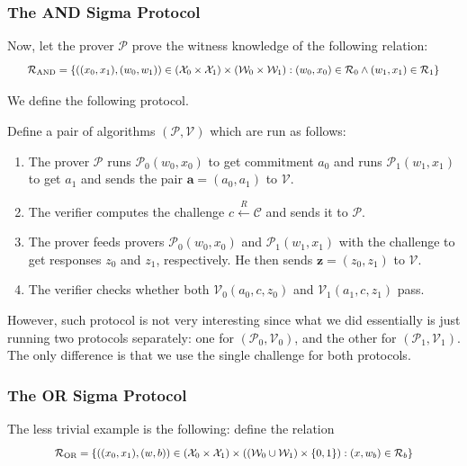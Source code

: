 \documentclass[../lecture-notes-148x210.tex]{subfiles}
\begin{document}
\subsubsection{The AND Sigma Protocol}

Now, let the prover $\mathcal{P}$ prove the witness knowledge of the following relation:
\begin{equation*}
    \scalebox{0.85}{$
        \mathcal{R}_{\text{AND}} = \left\{ ((x_0,x_1), (w_0,w_1)) \in (\mathcal{X}_0 \times \mathcal{X}_1) \times (\mathcal{W}_0 \times \mathcal{W}_1): (w_0,x_0) \in \mathcal{R}_0 \wedge (w_1,x_1) \in \mathcal{R}_1 \right\}
    $}
\end{equation*}

We define the following protocol.

\begin{definition}
    Define a pair of algorithms $(\mathcal{P},\mathcal{V})$ which are run as follows:
    \begin{enumerate}
        \item The prover $\mathcal{P}$ runs $\mathcal{P}_0(w_0,x_0)$ to get commitment $a_0$ and runs $\mathcal{P}_1(w_1,x_1)$ to get $a_1$ and sends the pair $\mathbf{a} = (a_0,a_1)$ to $\mathcal{V}$.
        \item The verifier computes the challenge $c \xleftarrow{R} \mathcal{C}$ and sends it to $\mathcal{P}$.
        \item The prover feeds provers $\mathcal{P}_0(w_0,x_0)$ and $\mathcal{P}_1(w_1,x_1)$ with the challenge to get responses $z_0$ and $z_1$, respectively. He then sends $\mathbf{z} = (z_0,z_1)$ to $\mathcal{V}$.
        \item The verifier checks whether both $\mathcal{V}_0(a_0,c,z_0)$ and $\mathcal{V}_1(a_1,c,z_1)$ pass.
    \end{enumerate}
\end{definition}

However, such protocol is not very interesting since what we did essentially is just running two protocols separately: one for $(\mathcal{P}_0,\mathcal{V}_0)$, and the other for $(\mathcal{P}_1,\mathcal{V}_1)$. The only difference is that we use the single challenge for both protocols.

\subsubsection{The OR Sigma Protocol}

The less trivial example is the following: define the relation
\begin{equation*}
    \scalebox{0.85}{$
    \mathcal{R}_{\text{OR}} = \left\{ ((x_0, x_1), (w, b)) \in (\mathcal{X}_0 \times \mathcal{X}_1) \times ((\mathcal{W}_0 \cup \mathcal{W}_1) \times \{0,1\}): (x, w_b) \in \mathcal{R}_b \right\}
    $}
\end{equation*}
\end{document}
